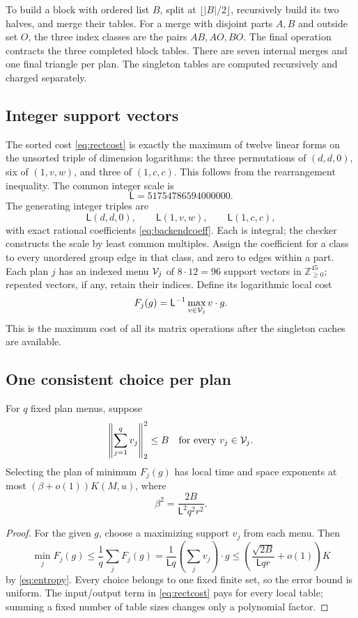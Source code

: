 To build a block with ordered list \(B\), split at
\(\lfloor|B|/2\rfloor\), recursively build its two halves, and merge their
tables. For a merge with disjoint parts \(A,B\) and outside set \(O\),
the three index classes are the pairs \(AB,AO,BO\). The final operation
contracts the three completed block tables.
There are seven internal merges and one final triangle per plan.
The singleton tables are computed recursively and charged separately.

\subsection{Integer support vectors}

The sorted cost \eqref{eq:rectcost} is exactly the maximum of twelve linear
forms on the unsorted triple of dimension logarithms:
the three permutations of \((d,d,0)\), six of \((1,v,w)\), and three of \((1,c,c)\).
This follows from the rearrangement inequality.
The common integer scale is
\[
 \mathsf L=51754786594000000.
\]
The generating integer triples are
\begin{equation}\label{eq:integertriples}
 \mathsf L(d,d,0),\qquad
 \mathsf L(1,v,w),\qquad
 \mathsf L(1,c,c),
\end{equation}
with exact rational coefficients \eqref{eq:backendcoeff}. Each is integral;
the checker constructs the scale by least common multiples.
Assign the coefficient for a class to every unordered group edge in that
class, and zero to edges within a part. Each plan \(j\) has an indexed menu
\(\mathcal V_j\) of \(8\cdot12=96\) support vectors in
\(\mathbb Z_{\ge0}^{45}\); repeated vectors, if any, retain their indices.
Define its logarithmic local cost
\[
 F_j(g)=\mathsf L^{-1}\max_{v\in\mathcal V_j}v\cdot g.
\]
This is the maximum cost of all its matrix operations after the singleton
caches are available.

\subsection{One consistent choice per plan}

\begin{lemma}\label{lem:norm}
For \(q\) fixed plan menus, suppose
\[
 \left\|\sum_{j=1}^q v_j\right\|_2^2\le B
 \quad\hbox{for every }v_j\in\mathcal V_j.
\]
Selecting the plan of minimum \(F_j(g)\) has local time and space
exponents at most \((\beta+o(1))K(M,u)\), where
\[
 \beta^2=\frac{2B}{\mathsf L^2q^2r^2}.
\]
\end{lemma}
\begin{proof}
For the given \(g\), choose a maximizing support \(v_j\) from each menu.
Then
\[
 \min_jF_j(g)\le\frac1q\sum_jF_j(g)
  =\frac1{\mathsf L q}\left(\sum_jv_j\right)\cdot g
  \le\left(\frac{\sqrt{2B}}{\mathsf L qr}+o(1)\right)K
\]
by \eqref{eq:entropy}. Every choice belongs to one fixed finite set, so
the error bound is uniform. The input/output term in
\eqref{eq:rectcost} pays for every local table; summing a fixed number
of table sizes changes only a polynomial factor.
\end{proof}

